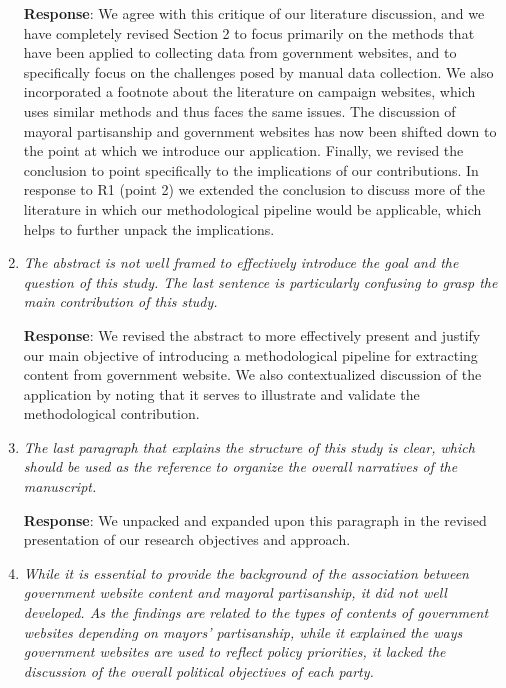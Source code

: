 \documentclass[12pt,titlepage]{article}
\begin{document}
\begin{enumerate}
    
    \textbf{Response}: We agree with this critique of our literature discussion, and we have completely revised Section 2 to focus primarily on the methods that have been applied to collecting data from government websites, and to specifically focus on the challenges posed by manual data collection. We also incorporated a footnote about the literature on campaign websites, which uses similar methods and thus faces the same issues. The discussion of mayoral partisanship and government websites has now been shifted down to the point at which we introduce our application. Finally, we revised the conclusion to point specifically to the implications of our contributions. In response to R1 (point 2) we extended the conclusion to discuss more of the literature in which our methodological pipeline would be applicable, which helps to further unpack the implications.
    
    

\item \emph{The abstract is not well framed to effectively introduce the goal and the question of this study. The last sentence is particularly confusing to grasp the main contribution of this study.}

     \textbf{Response}:  We revised the abstract to more effectively present and justify our main objective of introducing a methodological pipeline for extracting content from government website. We also contextualized discussion of the application by noting that it serves to illustrate and validate the methodological contribution.


\item \emph{The last paragraph that explains the structure of this study is clear, which should be used as the reference to organize the overall narratives of the manuscript.}

     \textbf{Response}: We unpacked and expanded upon this paragraph in the revised presentation of our research objectives and approach. 


\item \emph{ While it is essential to provide the background of the association between government website content and mayoral partisanship, it did not well developed. As the findings are related to the types of contents of government websites depending on mayors’ partisanship, while it explained the ways government websites are used to reflect policy priorities, it lacked the discussion of the overall political objectives of each party. }\\


\end{enumerate}
\end{document}
